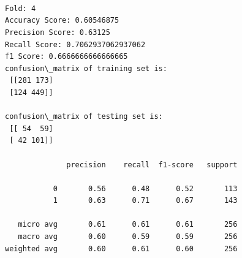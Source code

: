 \documentclass[11pt]{article}
\begin{document}
    \begin{center}
    \end{center}
    { \hspace*{\fill} \\}
    
    \begin{center}
    \end{center}
    { \hspace*{\fill} \\}
    
    \begin{Verbatim}[commandchars=\\\{\}]

Fold: 4
Accuracy Score: 0.60546875
Precision Score: 0.63125
Recall Score: 0.7062937062937062
f1 Score: 0.6666666666666665
confusion\_matrix of training set is: 
 [[281 173]
 [124 449]] 

confusion\_matrix of testing set is: 
 [[ 54  59]
 [ 42 101]] 

              precision    recall  f1-score   support

           0       0.56      0.48      0.52       113
           1       0.63      0.71      0.67       143

   micro avg       0.61      0.61      0.61       256
   macro avg       0.60      0.59      0.59       256
weighted avg       0.60      0.61      0.60       256


    \end{Verbatim}

    \begin{center}
    \end{center}
    { \hspace*{\fill} \\}
    
    \begin{center}
    \end{center}
    { \hspace*{\fill} \\}
    
\end{document}
